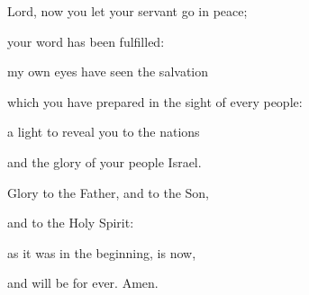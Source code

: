 \lettrine[loversize=0.15,lines=2]{L}{}ord, now you let your servant go in peace;~\GreStar{}~\nopagebreak

\hspace{2pt} your word has been fulfilled:

\noindent my own eyes have seen the salvation~\GreStar{}~\nopagebreak

which you have prepared in the sight of every people:

\noindent a light to reveal you to the nations~\GreStar{}~\nopagebreak

and the glory of your people Israel.

\noindent Glory to the Father, and to the Son,~\GreStar{}~\nopagebreak

and to the Holy Spirit:

\noindent as it was in the beginning, is now,~\GreStar{}~\nopagebreak

and will be for ever. Amen.
